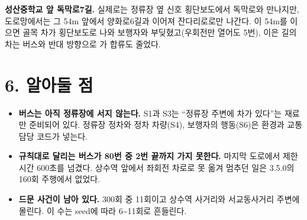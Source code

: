 \documentclass[10pt,a4paper]{extarticle}
\begin{document}
\vspace{4pt}
\textbf{성산중학교 앞 독막로7길.} 실제로는 정류장 옆 신호 횡단보도에서 독막로와 만나지만, 도로망에서는 그 54m 앞에서 양화로6길과 이어져 잔다리로로만 나간다. 이 54m를 이으면 골목 차가 횡단보도로 나와 보행자와 부딪혔고(우회전만 열어도 5번), 이은 길의 차는 버스와 반대 방향으로 가 합류도 줄었다.

\section{6. 알아둘 점}
\begin{itemize}
\item \textbf{버스는 아직 정류장에 서지 않는다.} S1과 S3는 ``정류장 주변에 차가 있다''는 재료만 준비되어 있다. 정류장 정차와 정차 차량(S4), 보행자의 행동(S6)은 환경과 교통 담당 코드가 넣는다.
\item \textbf{규칙대로 달리는 버스가 80번 중 2번 끝까지 가지 못한다.} 마지막 도로에서 제한 시간 600초를 넘겼다. 상수역 앞에서 좌회전 차로로 못 옮겨 멈추던 일은 3.5.0의 160회 주행에서 없었다.
\item \textbf{드문 사건이 남아 있다.} 300회 중 11회이고 상수역 사거리와 서교동사거리 주변에 몰린다. 이 수는 seed에 따라 6\textasciitilde 11회로 흔들린다.
\end{itemize}
\end{document}
